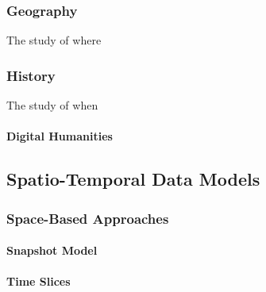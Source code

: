 \subsubsection{Geography} %
\label{ssub:geography}

The study of where



\subsubsection{History} %
\label{ssub:history}

The study of when


\paragraph{Digital Humanities} %
\label{par:digital_humanities}






\subsection{Spatio-Temporal Data Models} %
\label{sub:spatio_temporal_data_models}


\subsubsection{Space-Based Approaches} %
\label{ssub:space-based_approaches}


\paragraph{Snapshot Model} %
\label{par:snapshot_model}



\paragraph{Time Slices} %
\label{par:time_slices}

